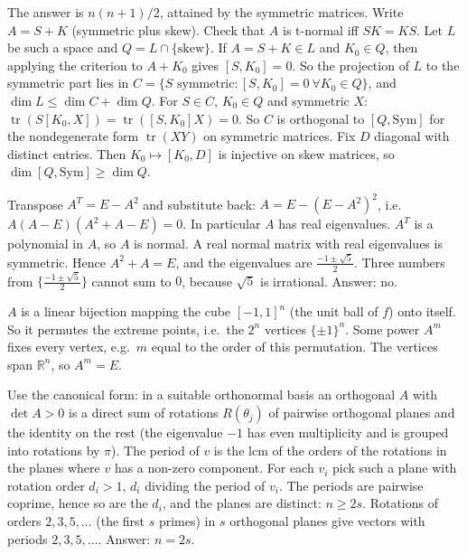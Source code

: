 \documentclass[11pt,a4paper]{article}
\begin{document}
The answer is \(n(n+1)/2\), attained by the symmetric matrices. Write \(A=S+K\) (symmetric plus skew). Check that \(A\) is t-normal iff \(SK=KS\).
Let \(L\) be such a space and \(Q=L\cap\{\text{skew}\}\). If \(A=S+K\in L\) and \(K_0\in Q\), then applying the criterion to \(A+K_0\) gives \([S,K_0]=0\). So the projection of \(L\) to the symmetric part lies in \(C=\{S\text{ symmetric}:[S,K_0]=0\ \forall K_0\in Q\}\), and \(\dim L\le\dim C+\dim Q\).
For \(S\in C\), \(K_0\in Q\) and symmetric \(X\): \(\operatorname{tr}(S[K_0,X])=\operatorname{tr}([S,K_0]X)=0\). So \(C\) is orthogonal to \([Q,\mathrm{Sym}]\) for the nondegenerate form \(\operatorname{tr}(XY)\) on symmetric matrices. Fix \(D\) diagonal with distinct entries. Then \(K_0\mapsto[K_0,D]\) is injective on skew matrices, so \(\dim[Q,\mathrm{Sym}]\ge\dim Q\).

Transpose \(A^T=E-A^2\) and substitute back: \(A=E-(E-A^2)^2\), i.e.\ \(A(A-E)(A^2+A-E)=0\). In particular \(A\) has real eigenvalues.
\(A^T\) is a polynomial in \(A\), so \(A\) is normal. A real normal matrix with real eigenvalues is symmetric. Hence \(A^2+A=E\), and the eigenvalues are \(\frac{-1\pm\sqrt5}2\).
Three numbers from \(\{\frac{-1\pm\sqrt5}2\}\) cannot sum to \(0\), because \(\sqrt5\) is irrational. Answer: no.

\(A\) is a linear bijection mapping the cube \([-1,1]^n\) (the unit ball of \(f\)) onto itself. So it permutes the extreme points, i.e.\ the \(2^n\) vertices \(\{\pm1\}^n\).
Some power \(A^m\) fixes every vertex, e.g.\ \(m\) equal to the order of this permutation. The vertices span \(\mathbb R^n\), so \(A^m=E\).

Use the canonical form: in a suitable orthonormal basis an orthogonal \(A\) with \(\det A\gt0\) is a direct sum of rotations \(R(\theta_j)\) of pairwise orthogonal planes and the identity on the rest (the eigenvalue \(-1\) has even multiplicity and is grouped into rotations by \(\pi\)).
The period of \(v\) is the lcm of the orders of the rotations in the planes where \(v\) has a non-zero component. For each \(v_i\) pick such a plane with rotation order \(d_i\gt1\), \(d_i\) dividing the period of \(v_i\). The periods are pairwise coprime, hence so are the \(d_i\), and the planes are distinct: \(n\ge2s\).
Rotations of orders \(2,3,5,\dots\) (the first \(s\) primes) in \(s\) orthogonal planes give vectors with periods \(2,3,5,\dots\). Answer: \(n=2s\).
\end{document}
